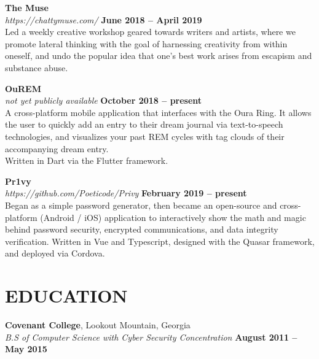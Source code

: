 \documentclass[margin,line]{resume}
\begin{document}
\begin{resume}
    \textbf{\listing The Muse}\\
    \textsl{https://chattymuse.com/} \hfill \textbf{June 2018 -- April 2019}\\
    Led a weekly creative workshop geared towards writers and artists, where we promote lateral thinking with the goal of harnessing creativity from within oneself, and undo the popular idea that one's best work arises from escapism and substance abuse.

    \textbf{\listing OuREM}\\
    \textsl{not yet publicly available} \hfill \textbf{October 2018 -- present}\\
    A cross-platform mobile application that interfaces with the Oura Ring. It allows the user to quickly add an entry to their dream journal via text-to-speech technologies, and visualizes your past REM cycles with tag clouds of their accompanying dream entry.\\
    Written in Dart via the Flutter framework.

    \textbf{\listing Pr1vy}\\
    \textsl{https://github.com/Poeticode/Privy} \hfill \textbf{February 2019 -- present}\\
    Began as a simple password generator, then became an open-source and cross-platform (Android / iOS) application to interactively show the math and magic behind password security, encrypted communications, and data integrity verification. Written in Vue and Typescript, designed with the Quasar framework, and deployed via Cordova.

    \vspace{-1mm}

\sectionline


    \section{\mysidestyle \textbf{\large{E}\small{DUCATION}}}

    \textbf{\listing Covenant College}, Lookout Mountain, Georgia \vspace{1mm}\\
    \textsl{B.S of Computer Science with Cyber Security Concentration} \hfill \textbf{August 2011 -- May 2015}\vspace{-3mm}\\\vspace{-1mm}%


\end{resume}
\end{document}

